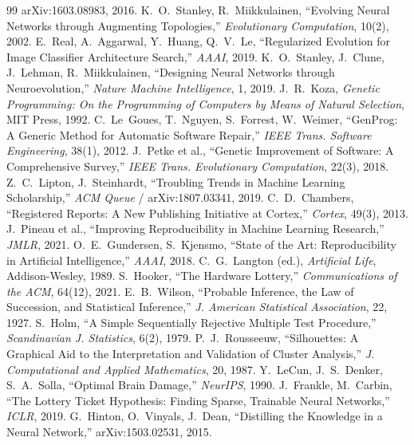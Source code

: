\documentclass[11pt]{article}
\begin{document}
\begin{thebibliography}{99}
arXiv:1603.08983, 2016.
 K.~O.~Stanley, R.~Miikkulainen,
``Evolving Neural Networks through Augmenting Topologies,''
\emph{Evolutionary Computation}, 10(2), 2002.
 E.~Real, A.~Aggarwal, Y.~Huang, Q.~V.~Le,
``Regularized Evolution for Image Classifier Architecture Search,''
\emph{AAAI}, 2019.
 K.~O.~Stanley, J.~Clune, J.~Lehman,
R.~Miikkulainen, ``Designing Neural Networks through Neuroevolution,''
\emph{Nature Machine Intelligence}, 1, 2019.
 J.~R.~Koza,
\emph{Genetic Programming: On the Programming of Computers by Means of Natural
Selection}, MIT Press, 1992.
 C.~Le~Goues, T.~Nguyen, S.~Forrest, W.~Weimer,
``GenProg: A Generic Method for Automatic Software Repair,''
\emph{IEEE Trans. Software Engineering}, 38(1), 2012.
 J.~Petke et al.,
``Genetic Improvement of Software: A Comprehensive Survey,''
\emph{IEEE Trans. Evolutionary Computation}, 22(3), 2018.
 Z.~C.~Lipton, J.~Steinhardt,
``Troubling Trends in Machine Learning Scholarship,''
\emph{ACM Queue} / arXiv:1807.03341, 2019.
 C.~D.~Chambers,
``Registered Reports: A New Publishing Initiative at Cortex,''
\emph{Cortex}, 49(3), 2013.
 J.~Pineau et al.,
``Improving Reproducibility in Machine Learning Research,'' \emph{JMLR}, 2021.
 O.~E.~Gundersen, S.~Kjensmo,
``State of the Art: Reproducibility in Artificial Intelligence,''
\emph{AAAI}, 2018.
 C.~G.~Langton (ed.),
\emph{Artificial Life}, Addison-Wesley, 1989.
 S.~Hooker,
``The Hardware Lottery,'' \emph{Communications of the ACM}, 64(12), 2021.
 E.~B.~Wilson,
``Probable Inference, the Law of Succession, and Statistical Inference,''
\emph{J. American Statistical Association}, 22, 1927.
 S.~Holm,
``A Simple Sequentially Rejective Multiple Test Procedure,''
\emph{Scandinavian J. Statistics}, 6(2), 1979.
 P.~J.~Rousseeuw,
``Silhouettes: A Graphical Aid to the Interpretation and Validation of Cluster
Analysis,'' \emph{J. Computational and Applied Mathematics}, 20, 1987.
 Y.~LeCun, J.~S.~Denker, S.~A.~Solla,
``Optimal Brain Damage,'' \emph{NeurIPS}, 1990.
 J.~Frankle, M.~Carbin,
``The Lottery Ticket Hypothesis: Finding Sparse, Trainable Neural Networks,''
\emph{ICLR}, 2019.
 G.~Hinton, O.~Vinyals, J.~Dean,
``Distilling the Knowledge in a Neural Network,'' arXiv:1503.02531, 2015.
\end{thebibliography}
\end{document}
